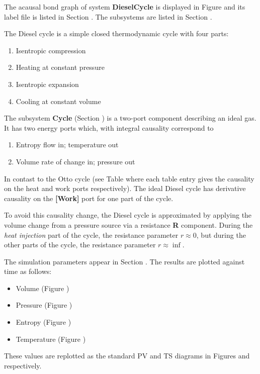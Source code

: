 
%
%

   The acausal bond graph of system \textbf{DieselCycle} is
   displayed in Figure  and its label
   file is listed in Section .
   The subsystems are listed in Section .


The Diesel cycle is a simple closed thermodynamic cycle with four parts:
\begin{enumerate}
\item Isentropic compression
\item Heating at constant pressure
\item Isentropic expansion
\item Cooling at constant volume
\end{enumerate}

The subsystem \textbf{Cycle} (Section ) is a two-port
component describing an ideal gas. It has two energy ports which, with
integral causality correspond to
\begin{enumerate}
\item Entropy flow in; temperature out
\item Volume rate of change in; pressure out
\end{enumerate}

In contast to the Otto cycle (see Table
 where each table entry gives the causality on the
heat and work ports respectively). The ideal Diesel cycle has
derivative causality on the {\bf [Work]} port for one part of the
cycle.

To avoid this causality change, the Diesel cycle is approximated by
applying the volume change from a pressure source via a resistance
{\bf R} component. During the {\em heat injection\/} part of the
cycle, the resistance parameter $r\approx 0$, but during the other parts of
the cycle, the resistance parameter $r\approx \inf$.

The simulation parameters appear in Section
. The results are plotted against time
as follows:
\begin{itemize}
\item Volume (Figure )
\item Pressure (Figure
)
\item Entropy (Figure )
\item Temperature (Figure
)
\end{itemize}

These values are replotted as the standard PV and TS diagrams in
Figures
and
respectively.





